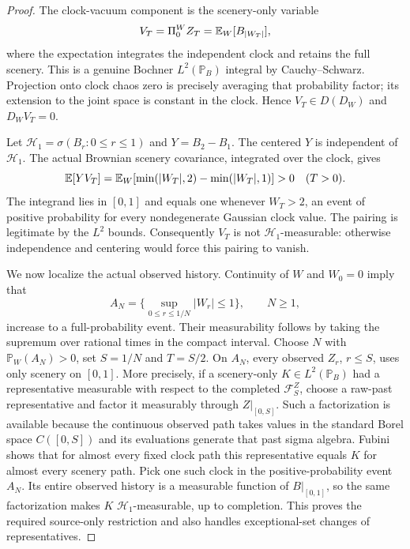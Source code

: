 \documentclass[11pt]{article}
\begin{document}
\begin{proof}
The clock-vacuum component is the scenery-only variable
\[
 V_T=\Pi_0^W Z_T=\mathbb E_W[B_{|W_T|}],
\]
where the expectation integrates the independent clock and retains the
full scenery. This is a genuine Bochner $L^2(\mathbb P_B)$ integral by
Cauchy--Schwarz. Projection onto clock chaos zero is precisely averaging
that probability factor; its extension to the joint space is constant
in the clock. Hence $V_T\in D(D_W)$ and $D_WV_T=0$.

Let $\mathcal H_1=\sigma(B_r:0\leq r\leq1)$ and $Y=B_2-B_1$.
The centered $Y$ is independent of $\mathcal H_1$. The actual Brownian
scenery covariance, integrated over the clock, gives
\[
 \mathbb E[YV_T]=\mathbb E_W[\min(|W_T|,2)-\min(|W_T|,1)]>0
                                  \quad(T>0).
\]
The integrand lies in $[0,1]$ and equals one whenever $W_T>2$, an event
of positive probability for every nondegenerate Gaussian clock value.
The pairing is legitimate by the $L^2$ bounds. Consequently $V_T$ is
not $\mathcal H_1$-measurable: otherwise independence and centering
would force this pairing to vanish.

We now localize the actual observed history. Continuity of $W$ and
$W_0=0$ imply that
\[
 A_N=\{\sup_{0\leq r\leq1/N}|W_r|\leq1\},\qquad N\geq1,
\]
increase to a full-probability event. Their measurability follows by
taking the supremum over rational times in the compact interval.
Choose $N$ with $\mathbb P_W(A_N)>0$, set $S=1/N$ and $T=S/2$.
On $A_N$, every observed $Z_r$, $r\leq S$, uses only scenery on $[0,1]$.
More precisely, if a scenery-only $K\in L^2(\mathbb P_B)$ had a
representative measurable with respect to the completed $\mathcal F_S^Z$,
choose a raw-past representative and factor it measurably through
$Z|_{[0,S]}$. Such a factorization is available because the continuous
observed path takes values in the standard Borel space $C([0,S])$ and
its evaluations generate that past sigma algebra. Fubini shows that
for almost every fixed clock path this representative equals $K$ for
almost every scenery path. Pick one such clock in the positive-probability
event $A_N$. Its entire observed history is a measurable function of
$B|_{[0,1]}$, so the same factorization makes $K$ $\mathcal H_1$-measurable,
up to completion. This proves the required source-only restriction and
also handles exceptional-set changes of representatives.


\end{proof}
\end{document}
